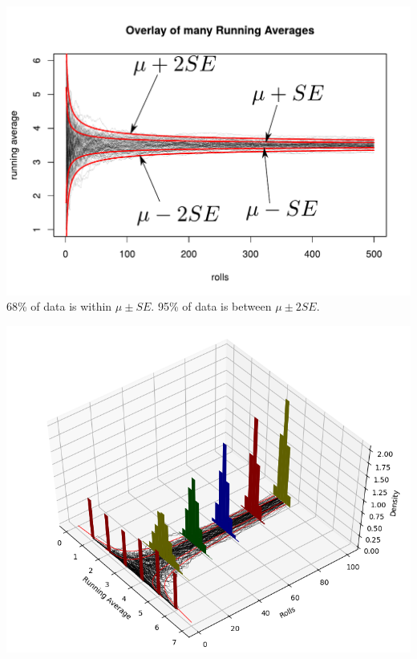 \begin{frame}
\includegraphics[scale=0.655]{4-2_conf_int/figures/run/running_die_overlay_lab1.pdf}
68\% of data is within $\mu \pm SE$. 95\% of data is between $\mu \pm 2SE$.
\end{frame}

\begin{frame}
\includegraphics[scale=0.6]{4-2_conf_int/figures/run/threedee.png}
\end{frame}

